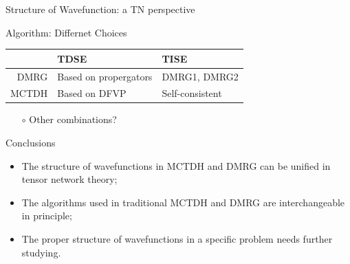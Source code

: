 \documentclass[12pt]{beamer}
\begin{document}
\begin{frame}{Structure of Wavefunction: a TN perspective}
\begin{itemize}
\begin{center}
            \end{center}
        \end{itemize}
    \end{frame}

    \begin{frame}{Algorithm: Differnet Choices}
        \begin{center}
            \begin{tabular}{r|ll}
                      & TDSE                 & TISE \\\hline
                DMRG  & Based on propergators & DMRG1, DMRG2 \\
                MCTDH & Based on DFVP        & Self-consistent \\
            \end{tabular}            
        \end{center}

        \begin{itemize}
            \item[$\circ$] Other combinations?
        \end{itemize}
    \end{frame}

    \begin{frame}{Conclusions}
        \begin{itemize}
            \item The structure of wavefunctions in  MCTDH and DMRG can be unified in tensor network theory;
            \item The algorithms used in traditional MCTDH and DMRG are interchangeable in principle;
            \item The proper structure of wavefunctions in a specific problem needs further studying.
        \end{itemize}
    \end{frame}
\end{document}
